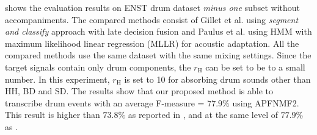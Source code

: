 \documentclass{article}
\begin{document}



 shows the evaluation results on ENST drum dataset \textit{minus one} subset without accompaniments. The compared methods consist of Gillet et al. \cite{gillet_transcription_2008} using \textit{segment and classify} approach with late decision fusion and Paulus et al. \cite{Paulus2009a} using HMM with maximum likelihood linear regression (MLLR) for acoustic adaptation. All the compared methods use the same dataset with the same mixing settings. Since the target signals contain only drum components, the $r_\mathrm{H}$ can be set to be to a small number. In this experiment, $r_\mathrm{H}$ is set to 10 for absorbing drum sounds other than HH, BD and SD. The results show that our proposed method is able to transcribe drum events with an average F-measure = $77.9\%$ using APFNMF2. This result is higher than $73.8\%$ as reported in \cite{gillet_transcription_2008}, and at the same level of $77.9\%$ as \cite{Paulus2009a}.    
\end{document}
